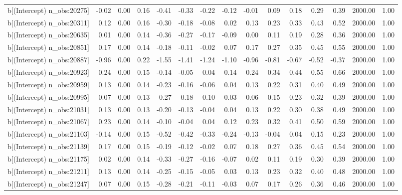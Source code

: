 \begin{table}[ht]
\begin{tabular}{rrrrrrrrrrrrrrr}
  b[(Intercept) n\_obs:20275] & -0.02 & 0.00 & 0.16 & -0.41 & -0.33 & -0.22 & -0.12 & -0.01 & 0.09 & 0.18 & 0.29 & 0.39 & 2000.00 & 1.00 \\ 
  b[(Intercept) n\_obs:20311] & 0.12 & 0.00 & 0.16 & -0.30 & -0.18 & -0.08 & 0.02 & 0.13 & 0.23 & 0.33 & 0.43 & 0.52 & 2000.00 & 1.00 \\ 
  b[(Intercept) n\_obs:20635] & 0.01 & 0.00 & 0.14 & -0.36 & -0.27 & -0.17 & -0.09 & 0.00 & 0.11 & 0.19 & 0.28 & 0.36 & 2000.00 & 1.00 \\ 
  b[(Intercept) n\_obs:20851] & 0.17 & 0.00 & 0.14 & -0.18 & -0.11 & -0.02 & 0.07 & 0.17 & 0.27 & 0.35 & 0.45 & 0.55 & 2000.00 & 1.00 \\ 
  b[(Intercept) n\_obs:20887] & -0.96 & 0.00 & 0.22 & -1.55 & -1.41 & -1.24 & -1.10 & -0.96 & -0.81 & -0.67 & -0.52 & -0.37 & 2000.00 & 1.00 \\ 
  b[(Intercept) n\_obs:20923] & 0.24 & 0.00 & 0.15 & -0.14 & -0.05 & 0.04 & 0.14 & 0.24 & 0.34 & 0.44 & 0.55 & 0.66 & 2000.00 & 1.00 \\ 
  b[(Intercept) n\_obs:20959] & 0.13 & 0.00 & 0.14 & -0.23 & -0.16 & -0.06 & 0.04 & 0.13 & 0.22 & 0.31 & 0.40 & 0.49 & 2000.00 & 1.00 \\ 
  b[(Intercept) n\_obs:20995] & 0.07 & 0.00 & 0.13 & -0.27 & -0.18 & -0.10 & -0.03 & 0.06 & 0.15 & 0.23 & 0.32 & 0.39 & 2000.00 & 1.00 \\ 
  b[(Intercept) n\_obs:21031] & 0.13 & 0.00 & 0.13 & -0.20 & -0.13 & -0.04 & 0.04 & 0.13 & 0.22 & 0.30 & 0.38 & 0.49 & 2000.00 & 1.00 \\ 
  b[(Intercept) n\_obs:21067] & 0.23 & 0.00 & 0.14 & -0.10 & -0.04 & 0.04 & 0.12 & 0.23 & 0.32 & 0.41 & 0.50 & 0.59 & 2000.00 & 1.00 \\ 
  b[(Intercept) n\_obs:21103] & -0.14 & 0.00 & 0.15 & -0.52 & -0.42 & -0.33 & -0.24 & -0.13 & -0.04 & 0.04 & 0.15 & 0.23 & 2000.00 & 1.00 \\ 
  b[(Intercept) n\_obs:21139] & 0.17 & 0.00 & 0.15 & -0.19 & -0.12 & -0.02 & 0.07 & 0.18 & 0.27 & 0.36 & 0.45 & 0.54 & 2000.00 & 1.00 \\ 
  b[(Intercept) n\_obs:21175] & 0.02 & 0.00 & 0.14 & -0.33 & -0.27 & -0.16 & -0.07 & 0.02 & 0.11 & 0.19 & 0.30 & 0.39 & 2000.00 & 1.00 \\ 
  b[(Intercept) n\_obs:21211] & 0.13 & 0.00 & 0.14 & -0.25 & -0.15 & -0.05 & 0.03 & 0.13 & 0.23 & 0.32 & 0.40 & 0.48 & 2000.00 & 1.00 \\ 
  b[(Intercept) n\_obs:21247] & 0.07 & 0.00 & 0.15 & -0.28 & -0.21 & -0.11 & -0.03 & 0.07 & 0.17 & 0.26 & 0.36 & 0.46 & 2000.00 & 1.00 \\ 

\end{tabular}
\end{table}
